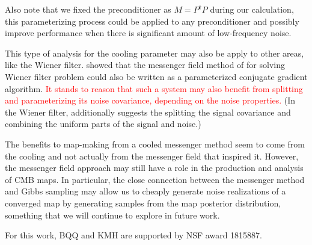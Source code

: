 \documentclass[twocolumn,linenumbers]{aastex631}
\newcommand{\Pdagger}{P^{\dagger}}
\newcommand{\kmh}[1]{\textcolor{red}{#1}}
\begin{document}
Also note that we fixed the preconditioner as $M = \Pdagger P$ during our calculation,
this parameterizing process could be applied to any preconditioner and possibly improve performance when 
there is significant amount of low-frequency noise.

This type of analysis for the cooling parameter may also be apply to other areas, like the Wiener filter.
\citet{2018A&A...620A..59P} showed that the messenger field method of \citet{2013A&A...549A.111E} for solving Wiener filter problem  could also be written as a parameterized conjugate gradient algorithm.
\kmh{It stands to reason that such a system may also benefit from splitting and parameterizing its noise covariance, depending on the noise properties.}
(In the Wiener filter, \citet{2017MNRAS.468.1782K} additionally suggests the splitting the signal covariance and combining the uniform parts of the signal and noise.)

The benefits to map-making from a cooled messenger method seem to come from the cooling and not actually from the messenger field that inspired it.  However, the messenger field approach may still have a role in the production and analysis of CMB maps.  In particular, the close connection between the messenger method and Gibbs sampling may allow us to cheaply generate noise realizations of a converged map by generating samples from the map posterior distribution, something that we will continue to explore in future work.












\begin{acknowledgments}
For this work, BQQ and KMH are supported by NSF award 1815887.
\end{acknowledgments}

%
\end{document}
